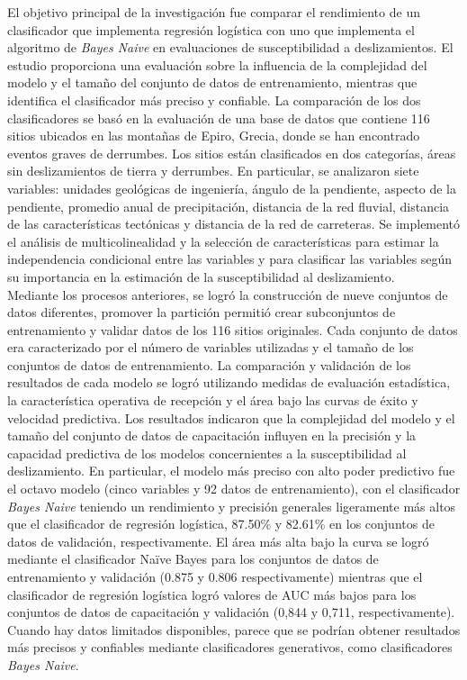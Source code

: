 El objetivo principal de la investigación fue comparar el rendimiento de un clasificador que implementa regresión logística con uno que implementa el algoritmo de \textit{Bayes Naive} en evaluaciones de susceptibilidad a deslizamientos. El estudio proporciona una evaluación sobre la influencia de la complejidad del modelo y el tamaño del conjunto de datos de entrenamiento, mientras que identifica el clasificador más preciso y confiable. La comparación de los dos clasificadores se basó en la evaluación de una base de datos que contiene 116 sitios ubicados en las montañas de Epiro, Grecia, donde se han encontrado eventos graves de derrumbes. Los sitios están clasificados en dos categorías, áreas sin deslizamientos de tierra y derrumbes. En particular, se analizaron siete variables: unidades geológicas de ingeniería, ángulo de la pendiente, aspecto de la pendiente, promedio anual de precipitación, distancia de la red fluvial, distancia de las características tectónicas y distancia de la red de carreteras. Se implementó el análisis de multicolinealidad y la selección de características para estimar la independencia condicional entre las variables y para clasificar las variables según su importancia en la estimación de la susceptibilidad al deslizamiento.\\

Mediante los procesos anteriores, se logró la construcción de nueve conjuntos de datos diferentes, promover la partición permitió crear subconjuntos de entrenamiento y validar datos de los 116 sitios originales. Cada conjunto de datos era caracterizado por el número de variables utilizadas y el tamaño de los conjuntos de datos de entrenamiento. La comparación y validación de los resultados de cada modelo se logró utilizando medidas de evaluación estadística, la característica operativa de recepción y el área bajo las curvas de éxito y velocidad predictiva. Los resultados indicaron que la complejidad del modelo y el tamaño del conjunto de datos de capacitación influyen en la precisión y la capacidad predictiva de los modelos concernientes a la susceptibilidad al deslizamiento. En particular, el modelo más preciso con alto poder predictivo fue el octavo modelo (cinco variables y 92 datos de entrenamiento), con el clasificador \textit{Bayes Naive} teniendo un rendimiento y precisión generales ligeramente más altos que el clasificador de regresión logística, 87.50\% y 82.61\% en los conjuntos de datos de validación, respectivamente. El área más alta bajo la curva se logró mediante el clasificador Naïve Bayes para los conjuntos de datos de entrenamiento y validación (0.875 y 0.806 respectivamente) mientras que el clasificador de regresión logística logró valores de AUC más bajos para los conjuntos de datos de capacitación y validación (0,844 y 0,711, respectivamente). Cuando hay datos limitados disponibles, parece que se podrían obtener resultados más precisos y confiables mediante clasificadores generativos, como clasificadores \textit{Bayes Naive}. 

